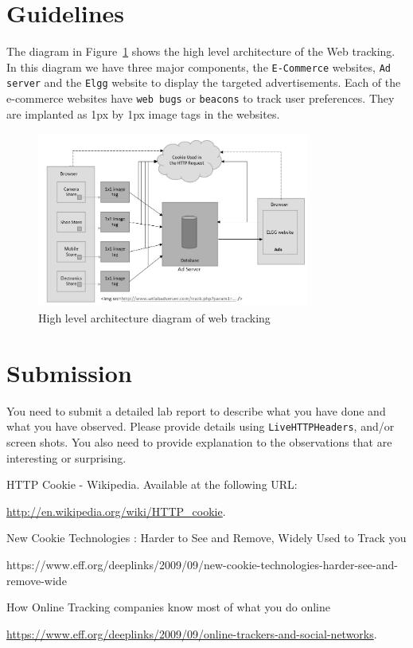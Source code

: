 \section{Guidelines}

The diagram in Figure~\ref{fig:guideline_figure} shows the high level architecture of the Web tracking. 
In this diagram we have three major components, the {\tt E-Commerce} websites, {\tt Ad server} and the {\tt Elgg} website to display the targeted advertisements. 
Each of the e-commerce websites have {\tt web bugs} or {\tt beacons} to track user preferences. 
They are implanted as 1px by 1px image tags in the websites.

	\begin{figure}
	\centering
	\includegraphics[width=0.8\textwidth,natwidth=621,natheight=403]{Figs/Guidelinefigure.jpg}
	\caption{High level architecture diagram of web tracking} 
	\label{fig:guideline_figure}
	\end{figure}


\section{Submission}

You need to submit a detailed lab report to describe what you have
done and what you have observed. Please provide details using 
{\tt LiveHTTPHeaders}, and/or screen shots. 
You also need to provide explanation
to the observations that are interesting or surprising.

\begin{thebibliography}{10}


HTTP Cookie - Wikipedia. Available at the following URL:

\newblock \url{http://en.wikipedia.org/wiki/HTTP_cookie}.

New Cookie Technologies : Harder to See and Remove, Widely Used to Track you 


https://www.eff.org/deeplinks/2009/09/new-cookie-technologies-harder-see-and-remove-wide



How Online Tracking companies know most of what you do online

\newblock \url{https://www.eff.org/deeplinks/2009/09/online-trackers-and-social-networks}.


\end{thebibliography}




